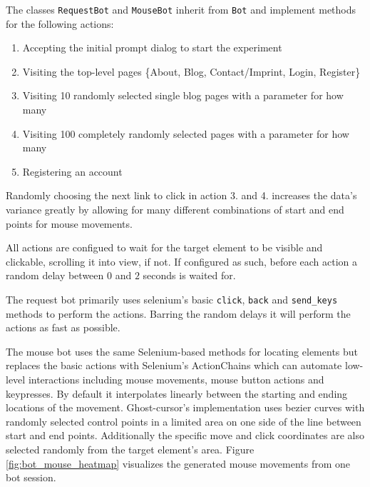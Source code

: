 \documentclass[
    fontsize=12pt,
    headings=small,
    parskip=half,           %
    bibliography=totoc,
    numbers=noenddot,       %
    open=any,               %
    final,                   %
    table
]{scrreprt}
\begin{document}
The classes \lstinline{RequestBot} and \lstinline{MouseBot} inherit from \lstinline{Bot} and implement methods for the following actions:

\begin{enumerate}
    \item Accepting the initial prompt dialog to start the experiment
    \item Visiting the top-level pages \{About, Blog, Contact/Imprint, Login, Register\}
    \item Visiting 10 randomly selected single blog pages with a parameter for how many
    \item Visiting 100 completely randomly selected pages with a parameter for how many
    \item Registering an account
\end{enumerate}

Randomly choosing the next link to click in action 3. and 4. increases the data's variance greatly by allowing for many different combinations of start and end points for mouse movements.

All actions are configued to wait for the target element to be visible and clickable, scrolling it into view, if not. If configured as such, before each action a random delay between $0$ and $2$ seconds is waited for.

The request bot primarily uses selenium's basic \lstinline{click}, \lstinline{back} and \lstinline{send_keys} methods to perform the actions. Barring the random delays it will perform the actions as fast as possible.


The mouse bot uses the same Selenium-based methods for locating elements but replaces the basic actions with Selenium's ActionChains which can automate low-level interactions including mouse movements, mouse button actions and keypresses. By default it interpolates linearly between the starting and ending locations of the movement. Ghost-cursor's implementation uses bezier curves with randomly selected control points in a limited area on one side of the line between start and end points. Additionally the specific move and click coordinates are also selected randomly from the target element's area. Figure \ref{fig:bot_mouse_heatmap} visualizes the generated mouse movements from one bot session.
\end{document}
